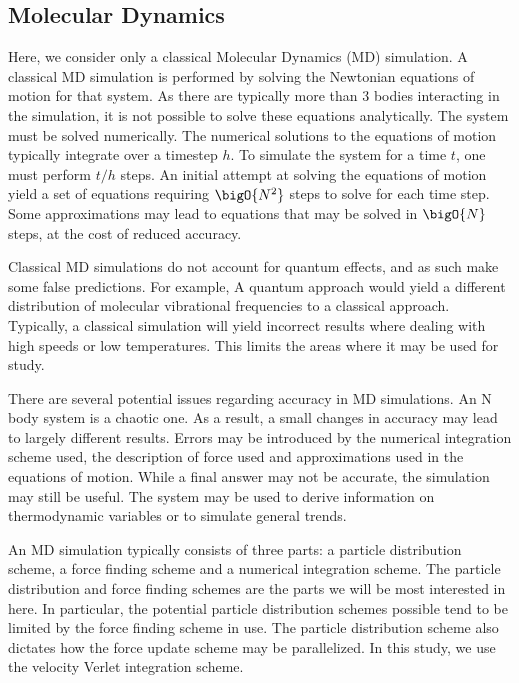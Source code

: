 %
%
\subsection{Molecular Dynamics}


Here, we consider only a classical Molecular Dynamics (MD) simulation.
%
A classical MD simulation is performed by
solving the Newtonian equations of motion for that system.
%
As there are typically more than 3 bodies interacting in the simulation,
it is not possible to solve these equations analytically.
%
The system must be solved numerically.
%
The numerical solutions to the equations of motion
typically integrate over a timestep $h$.
%
To simulate the system for a time $t$, one must perform $t/h$ steps.
%
An initial attempt at solving the equations of motion yield a set of equations
requiring $\bigO{N^2}$ steps to solve for each time step.
%
Some approximations may lead to equations that may be solved in $\bigO{N}$
steps, at the cost of reduced accuracy.


Classical MD simulations do not account for quantum effects,
and as such make some false predictions.
%
For example, A quantum approach would yield
a different distribution of molecular vibrational frequencies
to a classical approach.
%
Typically, a classical simulation will yield incorrect results where
dealing with high speeds or low temperatures.
%
This limits the areas where it may be used for study.



There are several potential issues regarding
accuracy in MD simulations.
%
An N body system is a chaotic one.
%
As a result, a small changes in accuracy may lead to largely different results.
%
Errors may be introduced by the numerical integration scheme used,
the description of force used and
approximations used in the equations of motion.
%
While a final answer may not be accurate, the simulation may still be useful.
%
The system may be used to derive information on thermodynamic variables
or to simulate general trends.



An MD simulation typically consists of three parts:
a particle distribution scheme,
a force finding scheme and
a numerical integration scheme.
%
The particle distribution and force finding schemes are
the parts we will be most interested in here.
%
In particular, the potential particle distribution schemes possible
tend to be limited by the force finding scheme in use.
%
The particle distribution scheme also dictates how the force update scheme
may be parallelized.
%
In this study, we use the velocity Verlet integration scheme.


